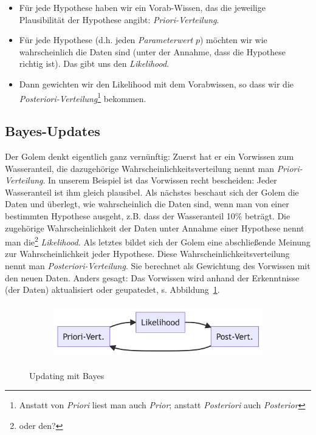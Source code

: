 \documentclass[
  a4paper,
  DIV=11]{scrreprt}
\theoremstyle{definition}
\theoremstyle{remark}
\begin{document}
\begin{itemize}
\item
  Für jede Hypothese haben wir ein Vorab-Wissen, das die jeweilige
  Plausibilität der Hypothese angibt: \emph{Priori-Verteilung}.
\item
  Für jede Hypothese (d.h. jeden \emph{Parameterwert} \(p\)) möchten wir
  wie wahrscheinlich die Daten sind (unter der Annahme, dass die
  Hypothese richtig ist). Das gibt uns den \emph{Likelihood}.
\item
  Dann gewichten wir den Likelihood mit dem Vorabwissen, so dass wir die
  \emph{Posteriori-Verteilung}\footnote{ Anstatt von \emph{Priori} liest
    man auch \emph{Prior}; anstatt \emph{Posteriori} auch
    \emph{Posterior}} bekommen.
\end{itemize}

\hypertarget{bayes-updates}{%
\subsection{Bayes-Updates}\label{bayes-updates}}

Der Golem denkt eigentlich ganz vernünftig: Zuerst hat er ein Vorwissen
zum Wasseranteil, die dazugehörige Wahrscheinlichkeitsverteilung nennt
man \emph{Priori-Verteilung}. In unserem Beispiel ist das Vorwissen
recht bescheiden: Jeder Wasseranteil ist ihm gleich plausibel. Als
nächstes beschaut sich der Golem die Daten und überlegt, wie
wahrscheinlich die Daten sind, wenn man von einer bestimmten Hypothese
ausgeht, z.B. dass der Wasseranteil 10\% beträgt. Die zugehörige
Wahrscheinlichkeit der Daten unter Annahme einer Hypothese nennt man
die\footnote{oder den?} \emph{Likelihood.} Als letztes bildet sich der
Golem eine abschließende Meinung zur Wahrscheinlichkeit jeder Hypothese.
Diese Wahrscheinlichkeitsverteilung nennt man
\emph{Posteriori-Verteilung}. Sie berechnet als Gewichtung des Vorwissen
mit den neuen Daten. Anders gesagt: Das Vorwissen wird anhand der
Erkenntnisse (der Daten) aktualisiert oder geupatedet, s.
Abbildung~\ref{fig-bayes-update}.

\begin{figure}

{\centering 

\begin{figure}[H]

{\centering \includegraphics[width=4.17in,height=0.93in]{./Globusversuch_files/figure-latex/mermaid-figure-1.png}

}

\end{figure}

}

\caption{\label{fig-bayes-update}Updating mit Bayes}

\end{figure}
\end{document}
